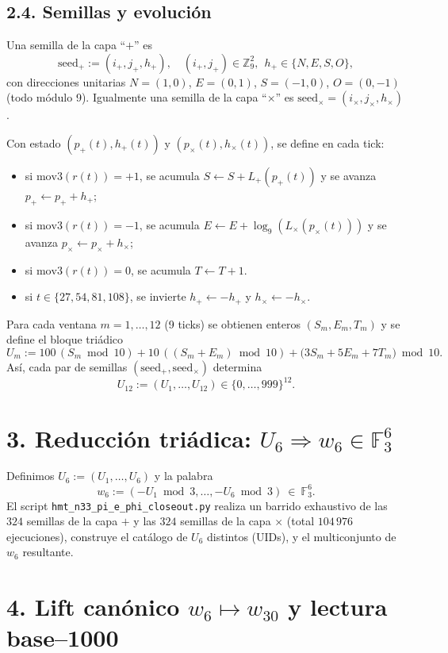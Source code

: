 \documentclass[11pt,a4paper]{article}
\theoremstyle{plain}
\theoremstyle{definition}
\theoremstyle{remark}
\begin{document}
\subsection*{2.4. Semillas y evoluci\'on}
Una semilla de la capa ``$+$'' es
\[
\mathrm{seed}_+:=(i_+,j_+,h_+),\quad (i_+,j_+)\in\mathbb Z_9^2,\ \ h_+\in\{N,E,S,O\},
\]
con direcciones unitarias $N=(1,0)$, $E=(0,1)$, $S=(-1,0)$, $O=(0,-1)$ (todo m\'odulo 9).
Igualmente una semilla de la capa ``$\times$'' es $\mathrm{seed}_{\times}=(i_{\times},j_{\times},h_{\times})$.

Con estado $(p_+(t),h_+(t))$ y $(p_{\times}(t),h_{\times}(t))$, se define en cada tick:
\begin{itemize}
\item si $\mathrm{mov3}(r(t))=+1$, se acumula $S\leftarrow S+L_+(p_+(t))$ y se avanza $p_+\leftarrow p_+ + h_+$;
\item si $\mathrm{mov3}(r(t))=-1$, se acumula $E\leftarrow E+\log_9(L_{\times}(p_{\times}(t)))$ y se avanza $p_{\times}\leftarrow p_{\times}+h_{\times}$;
\item si $\mathrm{mov3}(r(t))=0$, se acumula $T\leftarrow T+1$.
\item si $t\in\{27,54,81,108\}$, se invierte $h_+\leftarrow -h_+$ y $h_{\times}\leftarrow -h_{\times}$.
\end{itemize}

Para cada ventana $m=1,\dots,12$ (9 ticks) se obtienen enteros $(S_m,E_m,T_m)$ y se define el bloque tri\'adico
\[
U_m:=100\,(S_m\bmod 10)+10\,((S_m+E_m)\bmod 10)+\bigl(3S_m+5E_m+7T_m\bigr)\bmod 10.
\]
Así, cada par de semillas $(\mathrm{seed}_+,\mathrm{seed}_{\times})$ determina
\[
U_{12}:=(U_1,\dots,U_{12})\in\{0,\dots,999\}^{12}.
\]

\section*{3. Reducci\'on tri\'adica: $U_6\Rightarrow w_6\in\mathbb F_3^6$}

Definimos $U_6:=(U_1,\dots,U_6)$ y la palabra
\[
 w_6:=(-U_1\bmod 3,\dots,-U_6\bmod 3)\ \in\ \mathbb F_3^6.
\]
El script \texttt{hmt\_n33\_pi\_e\_phi\_closeout.py} realiza un barrido exhaustivo de las
\(324\) semillas de la capa $+$ y las \(324\) semillas de la capa $\times$ (total $104\,976$ ejecuciones),
construye el cat\'alogo de $U_6$ distintos (UIDs), y el multiconjunto de $w_6$ resultante.

\section*{4. Lift can\'onico $w_6\mapsto w_{30}$ y lectura base--1000}
\end{document}
